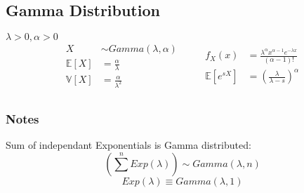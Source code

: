 \subsection{Gamma Distribution}
\(\lambda > 0, \alpha > 0 \)
\begin{equation*}
    \begin{aligned}
        X &\sim Gamma(\lambda, \alpha) \qquad\\
        \mathbb{E}[X] &= \frac{\alpha}{\lambda} \\
        \mathbb{V}[X] &= \frac{\alpha}{\lambda^2} \\
    \end{aligned}
    \begin{aligned}
        f_X(x) &= \frac{\lambda^\alpha x^{\alpha - 1} e^{-\lambda x}}{(\alpha - 1)!} \\
        \mathbb{E}[e^{sX}] &= \left(\frac{\lambda}{\lambda - s}\right)^\alpha \\
    \end{aligned}
\end{equation*}


\subsubsection{Notes}
Sum of independant Exponentials is Gamma distributed:
\begin{equation*}
    \left(\sum^{n} Exp(\lambda) \right) \sim Gamma(\lambda, n) 
\end{equation*}
\begin{equation*}
    Exp(\lambda) \equiv Gamma(\lambda, 1) 
\end{equation*}


